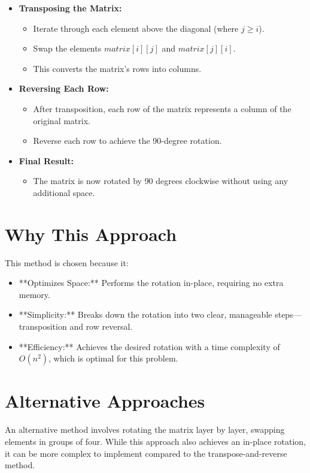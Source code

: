 \begin{itemize}
    \item \textbf{Transposing the Matrix:}
    \begin{itemize}
        \item Iterate through each element above the diagonal (where \( j \geq i \)).
        \item Swap the elements \( matrix[i][j] \) and \( matrix[j][i] \).
        \item This converts the matrix's rows into columns.
    \end{itemize}
    
    \item \textbf{Reversing Each Row:}
    \begin{itemize}
        \item After transposition, each row of the matrix represents a column of the original matrix.
        \item Reverse each row to achieve the 90-degree rotation.
    \end{itemize}
    
    \item \textbf{Final Result:}
    \begin{itemize}
        \item The matrix is now rotated by 90 degrees clockwise without using any additional space.
    \end{itemize}
\end{itemize}

\section*{Why This Approach}
This method is chosen because it:
\begin{itemize}
    \item **Optimizes Space:** Performs the rotation in-place, requiring no extra memory.
    \item **Simplicity:** Breaks down the rotation into two clear, manageable steps—transposition and row reversal.
    \item **Efficiency:** Achieves the desired rotation with a time complexity of \(O(n^2)\), which is optimal for this problem.
\end{itemize}

\section*{Alternative Approaches}
An alternative method involves rotating the matrix layer by layer, swapping elements in groups of four. While this approach also achieves an in-place rotation, it can be more complex to implement compared to the transpose-and-reverse method.

